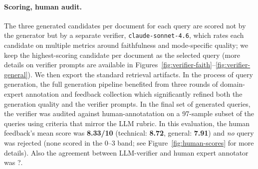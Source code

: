 \paragraph{Scoring, human audit.}
The three generated candidates per document for each query are scored not by the generator but by a
separate verifier, \texttt{claude-sonnet-4.6}, which rates each candidate
on multiple metrics around faithfulness and mode-specific quality; we keep the highest-scoring
candidate per document as the selected query (more details on verifier prompts are available in
Figures~\ref{fig:verifier-faith}--\ref{fig:verifier-general}). We then export the standard retrieval artifacts.
In the process of query generation, the full generation pipeline benefited from three rounds of domain-expert annotation and feedback collection which significantly refined both the generation quality and the verifier prompts. In the final set of generated queries, the
verifier was audited against human-annotatation on a 97-sample
subset of the queries using criteria that mirror the LLM rubric. %
In this evaluation, the human feedback's mean score was \textbf{8.33/10} (technical: \textbf{8.72}, general:
\textbf{7.91}) and \emph{no} query was rejected (none scored in the 0--3 band;
see Figure~\ref{fig:human-scores} for more details). %
Also the agreement between LLM-verifier and human expert annotator was ?.

